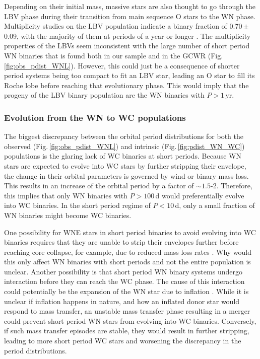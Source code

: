 Depending on their initial mass, massive stars are also thought to go through the LBV phase during their transition from main sequence O stars to the WN phase. Multiplicity studies on the LBV population indicate a binary fraction of 0.70\,$\pm$\,0.09, with the majority of them at periods of a year or longer \citep{mahy_multiplicity_2022}. The multiplicity properties of the LBVs seem inconsistent with the large number of short period WN binaries that is found both in our sample and in the GCWR (Fig.\,\ref{fig:obs_pdist_WNL}). However, this could just be a consequence of shorter period systems being too compact to fit an LBV star, leading an O star to fill its Roche lobe before reaching that evolutionary phase. This would imply that the progeny of the LBV binary population are the WN binaries with $P>1$\,yr.

\subsubsection{Evolution from the WN to WC populations}\label{sect:evol_WNWC}

The biggest discrepancy between the orbital period distributions for both the observed (Fig.\,\ref{fig:obs_pdist_WNL}) and intrinsic (Fig.\,\ref{fig:pdist_WN_WC}) populations is the glaring lack of WC binaries at short periods. Because WN stars are expected to evolve into WC stars by further stripping their envelope, the change in their orbital parameters is governed by wind or binary mass loss. This results in an increase of the orbital period by a factor of ${\sim}1.5$-2. Therefore, this implies that only WN binaries with $P>100\,$d would preferentially evolve into WC binaries. In the short period regime of $P<10\,$d, only a small fraction of WN binaries might become WC binaries.

One possibility for WNE stars in short period binaries to avoid evolving into WC binaries requires that they are unable to strip their envelopes further before reaching core collapse, for example, due to reduced mass loss rates \citep[possible implications from][]{neijssel_wind_2021}. Why would this only affect WN binaries with short periods and not the entire population is unclear. Another possibility is that short period WN binary systems undergo interaction before they can reach the WC phase. The cause of this interaction could potentially be the expansion of the WN star due to inflation \citep{grafener_stellar_2012,sanyal_massive_2015,grassitelli_subsonic_2018,ro_wolf-rayet_2019}. While it is unclear if inflation happens in nature, and how an inflated donor star would respond to mass transfer, an unstable mass transfer phase resulting in a merger could prevent short period WN stars from evolving into WC binaries. Conversely, if such mass transfer episodes are stable, they would result in further stripping, leading to more short period WC stars and worsening the discrepancy in the period distributions.

